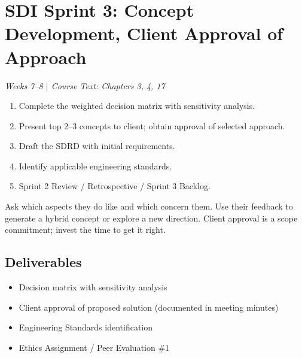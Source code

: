 \section{SDI Sprint 3: Concept Development, Client Approval of Approach}
\textit{Weeks 7--8 $|$ Course Text: Chapters 3, 4, 17}

\begin{priorities}
\begin{enumerate}[nosep]
\item Complete the weighted decision matrix with sensitivity analysis.
\item Present top 2--3 concepts to client; obtain approval of selected approach.
\item Draft the SDRD with initial requirements.
\item Identify applicable engineering standards.
\item Sprint 2 Review / Retrospective / Sprint 3 Backlog.
\end{enumerate}
\end{priorities}

\begin{faqbox}
Ask which aspects they do like and which concern them. Use their feedback to generate a hybrid concept or explore a new direction. Client approval is a scope commitment; invest the time to get it right.
\end{faqbox}

\subsection{Deliverables}
\begin{itemize}[nosep,leftmargin=1.5em]
\item Decision matrix with sensitivity analysis
\item Client approval of proposed solution (documented in meeting minutes)
\item Engineering Standards identification
\item Ethics Assignment / Peer Evaluation \#1
\end{itemize}



